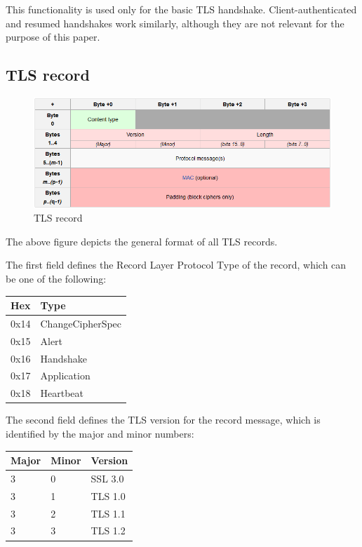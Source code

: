 This functionality is used only for the basic TLS handshake.
Client-authenticated and resumed handshakes work similarly, although they are not
relevant for the purpose of this paper.

\subsection{TLS record}

\begin{figure}[H] \caption{TLS record} \centering
\includegraphics[width=1\textwidth]{diagrams/tls_record.png}\end{figure}

The above figure depicts the general format of all TLS records.

The first field defines the Record Layer Protocol Type of the record, which can
be one of the following:

\begin{table}[H] \centering \begin{tabular}{ | l | l | } \hline \textbf{Hex} &
\textbf{Type} \\ \hline 0x14 & ChangeCipherSpec \\ 0x15 & Alert \\ 0x16 &
Handshake \\ 0x17 & Application \\ 0x18 & Heartbeat \\ \hline \end{tabular}
\end{table}

The second field defines the TLS version for the record message, which is
identified by the major and minor numbers:

\begin{table}[H] \centering \begin{tabular}{ | l | l | l | } \hline
\textbf{Major} & \textbf{Minor} & \textbf{Version} \\ \hline 3 & 0 & SSL 3.0 \\
3 & 1 & TLS 1.0 \\ 3 & 2 & TLS 1.1 \\ 3 & 3 & TLS 1.2 \\ \hline \end{tabular}
\end{table}

